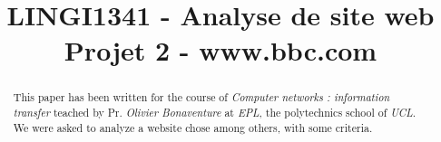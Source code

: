 \documentclass[conference]{IEEEtran}
\begin{document}
%
\title{LINGI1341 - Analyse de site web\\Projet 2 - www.bbc.com}


\author{
}


\maketitle


\begin{abstract}
This paper has been written for the course of \textit{Computer networks : information transfer
} teached by Pr. \textit{Olivier Bonaventure} at \textit{EPL}, the polytechnics school of \textit{UCL}. We were asked to analyze a website chose among others, with some criteria.  
\end{abstract}







%
\IEEEpeerreviewmaketitle
\end{document}
